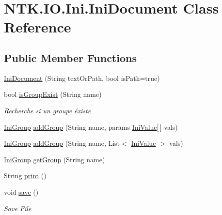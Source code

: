 \hypertarget{class_n_t_k_1_1_i_o_1_1_ini_1_1_ini_document}{}\section{N\+T\+K.\+I\+O.\+Ini.\+Ini\+Document Class Reference}
\label{class_n_t_k_1_1_i_o_1_1_ini_1_1_ini_document}


 


\subsection*{Public Member Functions}
\begin{DoxyCompactItemize}
\item 
\mbox{\hyperlink{class_n_t_k_1_1_i_o_1_1_ini_1_1_ini_document_a755ae2499542a1f128f70ce9aa4cc16b}{Ini\+Document}} (String text\+Or\+Path, bool is\+Path=true)
\item 
bool \mbox{\hyperlink{class_n_t_k_1_1_i_o_1_1_ini_1_1_ini_document_a2d660b83ff739a7001808493e4fb5891}{is\+Group\+Exist}} (String name)
\begin{DoxyCompactList}\small\item\em Recherche si un groupe éxiste \end{DoxyCompactList}\item 
\mbox{\hyperlink{class_n_t_k_1_1_i_o_1_1_ini_1_1_ini_group}{Ini\+Group}} \mbox{\hyperlink{class_n_t_k_1_1_i_o_1_1_ini_1_1_ini_document_adce6bc6eba716042b10745645fd74ebf}{add\+Group}} (String name, params \mbox{\hyperlink{class_n_t_k_1_1_i_o_1_1_ini_1_1_ini_value}{Ini\+Value}}\mbox{[}$\,$\mbox{]} vals)
\item 
\mbox{\hyperlink{class_n_t_k_1_1_i_o_1_1_ini_1_1_ini_group}{Ini\+Group}} \mbox{\hyperlink{class_n_t_k_1_1_i_o_1_1_ini_1_1_ini_document_a8f096a4a767cd5e7faf80ee8419c087d}{add\+Group}} (String name, List$<$ \mbox{\hyperlink{class_n_t_k_1_1_i_o_1_1_ini_1_1_ini_value}{Ini\+Value}} $>$ vals)
\item 
\mbox{\hyperlink{class_n_t_k_1_1_i_o_1_1_ini_1_1_ini_group}{Ini\+Group}} \mbox{\hyperlink{class_n_t_k_1_1_i_o_1_1_ini_1_1_ini_document_ae4724a7590b8aac00d010e8ec81ee419}{get\+Group}} (String name)
\item 
String \mbox{\hyperlink{class_n_t_k_1_1_i_o_1_1_ini_1_1_ini_document_a3b1fb327dd3c8c171e2062d719b250bd}{print}} ()
\item 
void \mbox{\hyperlink{class_n_t_k_1_1_i_o_1_1_ini_1_1_ini_document_a95d7360a38aa60e7814b1ab578d84486}{save}} ()
\begin{DoxyCompactList}\small\item\em Save File \end{DoxyCompactList}\end{DoxyCompactItemize}
